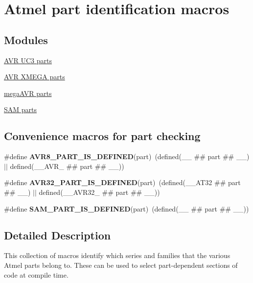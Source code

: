 \hypertarget{group__part__macros__group}{}\section{Atmel part identification macros}
\label{group__part__macros__group}
\subsection*{Modules}
\begin{DoxyCompactItemize}
\item 
\hyperlink{group__uc3__part__macros__group}{A\+V\+R U\+C3 parts}
\item 
\hyperlink{group__xmega__part__macros__group}{A\+V\+R X\+M\+E\+G\+A parts}
\item 
\hyperlink{group__mega__part__macros__group}{mega\+A\+V\+R parts}
\item 
\hyperlink{group__sam__part__macros__group}{S\+A\+M parts}
\end{DoxyCompactItemize}
\subsection*{Convenience macros for part checking}
\begin{DoxyCompactItemize}
\item 
\hypertarget{group__part__macros__group_ga2fb54ec8ba6d98af5ed21dfb4ec97483}{}\#define {\bfseries A\+V\+R8\+\_\+\+P\+A\+R\+T\+\_\+\+I\+S\+\_\+\+D\+E\+F\+I\+N\+E\+D}(part)~(defined(\+\_\+\+\_\+ \#\# part \#\# \+\_\+\+\_\+) $\vert$$\vert$ defined(\+\_\+\+\_\+\+A\+V\+R\+\_\+ \#\# part \#\# \+\_\+\+\_\+))\label{group__part__macros__group_ga2fb54ec8ba6d98af5ed21dfb4ec97483}

\item 
\hypertarget{group__part__macros__group_gac253d1a424ff2bc355184e3cdb93514d}{}\#define {\bfseries A\+V\+R32\+\_\+\+P\+A\+R\+T\+\_\+\+I\+S\+\_\+\+D\+E\+F\+I\+N\+E\+D}(part)~(defined(\+\_\+\+\_\+\+A\+T32 \#\# part \#\# \+\_\+\+\_\+) $\vert$$\vert$ defined(\+\_\+\+\_\+\+A\+V\+R32\+\_\+ \#\# part \#\# \+\_\+\+\_\+))\label{group__part__macros__group_gac253d1a424ff2bc355184e3cdb93514d}

\item 
\hypertarget{group__part__macros__group_ga50580478fd56bb842e0cbdd354a6933c}{}\#define {\bfseries S\+A\+M\+\_\+\+P\+A\+R\+T\+\_\+\+I\+S\+\_\+\+D\+E\+F\+I\+N\+E\+D}(part)~(defined(\+\_\+\+\_\+ \#\# part \#\# \+\_\+\+\_\+))\label{group__part__macros__group_ga50580478fd56bb842e0cbdd354a6933c}

\end{DoxyCompactItemize}


\subsection{Detailed Description}
This collection of macros identify which series and families that the various Atmel parts belong to. These can be used to select part-\/dependent sections of code at compile time. 